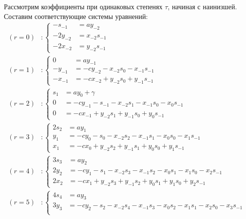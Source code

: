 Рассмотрим коэффициенты при одинаковых степенях $ \tau $, начиная с наинизшей.
Составим соответствующие системы уравнений:
\begin{equation*}
	\begin{aligned}
		(r = 0) &:		
		\left\{
			\begin{aligned}
				-s_{-1} &= ay_{-2} \\
				-2y_{-2} &= x_{-2} s_{-1} \\
				-2x_{-2} &= y_{-2} s_{-1}
			\end{aligned}
		\right.
		\\		
		(r = 1) &:	
		\left\{
			\begin{aligned}
				0 &= ay_{-1} \\
				-y_{-1} &= -cy_{-2} - x_{-2}s_0 - x_{-1}s_{-1}  \\
				-x_{-1} &= -cx_{-2} + y_{-2}s_0 + y_{-1}s_{-1}
			\end{aligned}
		\right.
		\\
		(r = 2) &:	
		\left\{
			\begin{aligned}
				s_1 &= ay_{0} + \gamma \\
				0 &= -cy_{-1} - s_{-1} - x_{-2}s_1 - x_{-1}s_0 - x_0s_{-1}  \\
				0 &= -cx_{-1} + y_{-2}s_1 + y_{-1}s_0 + y_{0}s_{-1}
			\end{aligned}
		\right.
		\\
		(r = 3) &:	
		\left\{
			\begin{aligned}
				2s_2 &= ay_{1} \\
				y_1 &= -cy_{0} - s_0 - x_{-2}s_2 - x_{-1}s_1 - x_0s_0 - x_1s_{-1}  \\
				x_1 &= -cx_{0} + y_{-2}s_2 + y_{-1}s_1 + y_{0}s_0 + y_1s_{-1}
			\end{aligned}
		\right.
		\\
		(r = 4) &:	
		\left\{
			\begin{aligned}
				3s_3 &= ay_{2} \\
				2y_2 &= -cy_{1} - s_1 - x_{-2}s_3 - x_{-1}s_2 - x_0s_1 - x_1s_0 - x_2s_{-1}  \\
				2x_2 &= -cx_{1} + y_{-2}s_3 + y_{-1}s_2 + y_{0}s_1 + y_1s_0 + y_2s_{-1}
			\end{aligned}
		\right.
		\\
		(r = 5) &:	
		\left\{
			\begin{aligned}
				4s_4 &= ay_{3} \\
				3y_3 &= -cy_{2} - s_2 - x_{-2}s_4 - x_{-1}s_3 - x_0s_2 - x_1s_1 - x_2s_0 - x_3s_{-1} \\

\end{aligned}
\end{aligned}
\end{equation*}
